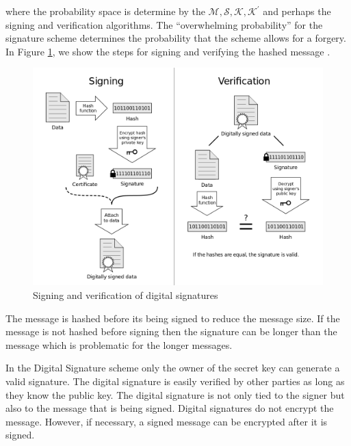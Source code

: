 	where the probability space is determine by the $\mathcal {M, S, K, K^{'}}$ and perhaps the signing and verification algorithms.
	The ``overwhelming probability'' for the signature scheme determines the probability that the scheme allows for a forgery.
	In Figure \ref{fig:digita-signature}, we show the steps for signing and verifying the hashed message \cite{DigitalSignature}. 
	\begin{figure}[h]
		\centering
		\includegraphics[scale = 0.4]{images/Digital_Signature_diagram.png}
		\caption{ Signing and verification of digital signatures}
		\label{fig:digita-signature}
	\end{figure}
	The message is hashed before its being signed to reduce the message size. 
	If the message is not hashed before signing then the signature can be longer than the message which is problematic for the longer messages.

	In the Digital Signature scheme only the owner of the secret key can generate a valid signature.
	The digital signature is easily verified by other parties as long as they know the public key.
	The digital signature is not only tied to the signer but also to the message that is being signed.
	Digital signatures do not encrypt the message. However, if necessary, a signed message can be encrypted after it is signed.


